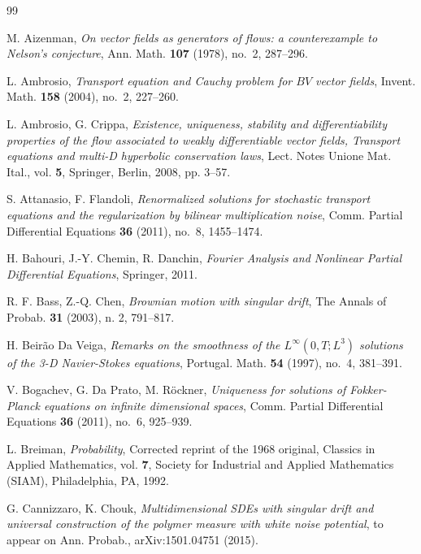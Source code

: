 \documentclass[a4paper,10pt]{article}
\newcommand\1{\mathbbm{1}}
\numberwithin{equation}{section}
\begin{document}
\begin{thebibliography}{99}                                                                                               

M. Aizenman, \textit{On vector fields as generators of flows: a counterexample to
  {N}elson's conjecture}, Ann. Math. \textbf{{\bf107}} (1978), no.~2, 287--296.

L. Ambrosio, \textit{Transport equation and {C}auchy problem for {$BV$} vector
  fields}, Invent. Math. \textbf{{\bf158}} (2004), no.~2, 227--260.

 L. Ambrosio, G. Crippa, \textit{Existence, uniqueness, stability and differentiability properties of the flow associated to weakly differentiable vector fields, Transport equations and multi-D hyperbolic conservation laws}, Lect. Notes Unione Mat. Ital., vol. \textbf{5}, Springer, Berlin, 2008, pp. 3--57.

 S. Attanasio, F. Flandoli, \textit{Renormalized solutions for stochastic transport equations and the regularization by bilinear multiplication noise}, Comm. Partial Differential Equations \textbf{36} (2011), no.~8, 1455--1474.

 H. Bahouri, J.-Y. Chemin, R. Danchin, \textit{Fourier Analysis and Nonlinear Partial Differential Equations}, Springer, 2011.

R. F. Bass, Z.-Q. Chen, \textit{Brownian motion with singular drift},
The Annals of Probab. \textbf{31} (2003), n. 2, 791--817.

H. Beir\~{a}o Da Veiga, \textit{Remarks on the smoothness of the $L^{\infty
}(0,T;L^{3})$ solutions of the 3-D Navier-Stokes equations}, Portugal.
Math. \textbf{54} (1997), no.~4, 381--391.

 V. Bogachev, G. Da Prato, M. R\"{o}ckner, \textit{Uniqueness for solutions of Fokker-Planck equations on infinite dimensional spaces}, Comm. Partial
Differential Equations \textbf{36} (2011), no.~6, 925--939.

 L. Breiman, \textit{Probability}, Corrected reprint of the 1968 original, Classics in Applied Mathematics, vol. \textbf{7}, Society for Industrial and Applied Mathematics (SIAM), Philadelphia, PA, 1992.

G. Cannizzaro, K. Chouk, \textit{Multidimensional SDEs with singular drift and universal construction of the polymer measure with white noise potential}, to appear on Ann. Probab., arXiv:1501.04751 (2015).


\end{thebibliography}
\end{document}
